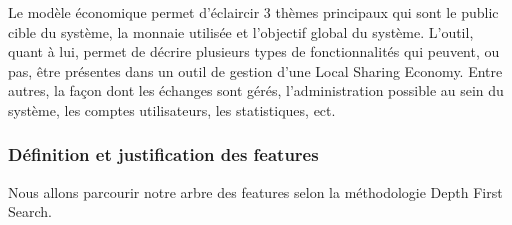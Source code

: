 Le modèle économique permet d'éclaircir 3 thèmes principaux qui sont le public cible du système,  la monnaie utilisée et l'objectif global du système.  L'outil,  quant à lui,  permet de décrire plusieurs types de fonctionnalités qui peuvent,  ou pas,  être présentes dans un outil de gestion d'une Local Sharing Economy.  Entre autres,  la façon dont les échanges sont gérés,  l'administration possible au sein du système,  les comptes utilisateurs,  les statistiques,  ect.  

\subsubsection{Définition et justification des features}

Nous allons parcourir notre arbre des features selon la méthodologie Depth First Search.

